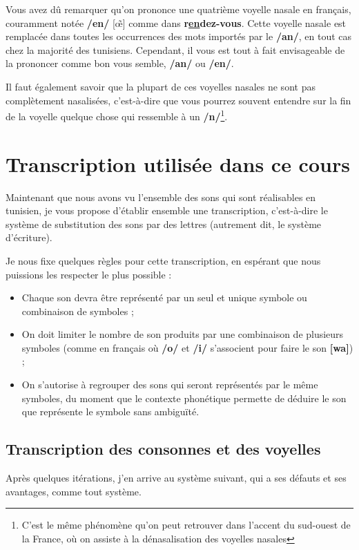 Vous avez dû remarquer qu'on prononce une quatrième voyelle nasale en français, couramment notée \textbf{/en/} [\~\oe] comme dans \textbf{r\underline{en}dez-vous}. Cette voyelle nasale est remplacée dans toutes les occurrences des mots importés par le \textbf{/an/}, en tout cas chez la majorité des tunisiens. Cependant, il vous est tout à fait envisageable de la prononcer comme bon vous semble, \textbf{/an/} ou \textbf{/en/}.

Il faut également savoir que la plupart de ces voyelles nasales ne sont pas complètement nasalisées, c'est-à-dire que vous pourrez souvent entendre sur la fin de la voyelle quelque chose qui ressemble à un \textbf{/n/}\footnote{C'est le même phénomène qu'on peut retrouver dans l'accent du sud-ouest de la France, où on assiste à la dénasalisation des voyelles nasales}. 

\section{Transcription utilisée dans ce cours}

Maintenant que nous avons vu l'ensemble des sons qui sont réalisables en  tunisien, je vous propose d'établir ensemble une transcription, c'est-à-dire le système de substitution des sons par des lettres (autrement dit, le système d'écriture).

Je nous fixe quelques règles pour cette transcription, en espérant que nous puissions les respecter le plus possible :
\begin{itemize}
    \item Chaque son devra être représenté par un seul et unique symbole ou combinaison de symboles ;
    \item On doit limiter le nombre de son produits par une combinaison de plusieurs symboles (comme en français où \textbf{/o/} et \textbf{/i/} s'associent pour faire le son \textbf{[wa]}) ;
    \item On s'autorise à regrouper des sons qui seront représentés par le même symboles, du moment que le contexte phonétique permette de déduire le son que représente le symbole sans ambiguïté.
\end{itemize}

\subsection{Transcription des consonnes et des voyelles}
Après quelques itérations, j'en arrive au système suivant, qui a ses défauts et ses avantages, comme tout système. 

